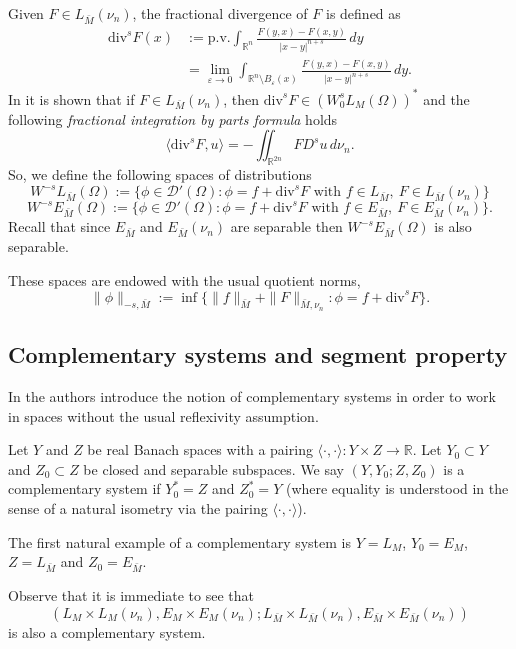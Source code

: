 \documentclass{amsart}
\newcommand{\R}{{\mathbb R}}
\newcommand{\ve}{\varepsilon}
\theoremstyle{remark}
\theoremstyle{definition}
\numberwithin{equation}{section}
\begin{document}
Given $F\in L_{\bar{M}}(\nu_n)$, the fractional divergence of $F$ is defined as
\begin{align*}
{\mathrm{div}}^s F(x) &:= \text{p.v.} \int_{\R^n} \frac{F(y,x)-F(x,y)}{|x-y|^{n+s}}\, dy \\
&= \lim_{\ve\to 0} \int_{\R^n\setminus B_\ve(x)}\frac{F(y,x)-F(x,y)}{|x-y|^{n+s}}\, dy.
\end{align*}
In \cite{FBPLS} it is shown that if $F\in L_{\bar M}(\nu_n)$, then ${\mathrm{div}}^s F\in (W^s_0L_M(\Omega))^*$ and the following {\em fractional integration by parts formula} holds
\begin{equation}\label{int.by.parts}
\langle {\mathrm{div}}^s F, u\rangle = -\iint_{\R^{2n}} F D^s u\, d\nu_n.
\end{equation}
So, we define the following spaces of distributions
$$
W^{-s}L_{\bar M}(\Omega) := \{\phi\in {\mathcal D}'(\Omega)\colon \phi = f + \mathrm{div}^sF \text{ with } f\in L_{\bar M},\ F\in L_{\bar M}(\nu_n)\}
$$
$$
W^{-s}E_{\bar M}(\Omega) := \{\phi\in {\mathcal D}'(\Omega)\colon \phi = f + \mathrm{div}^sF \text{ with } f\in E_{\bar M},\ F\in E_{\bar M}(\nu_n)\}.
$$
Recall that since $E_{\bar{M}}$ and $E_{\bar{M}}(\nu_n)$ are separable then $W^{-s}E_{\bar M}(\Omega)$ is also separable.

These spaces are endowed with the usual quotient norms,
$$
\|\phi\|_{-s, \bar M} := \inf\{\|f\|_{\bar M} + \|F\|_{\bar M, \nu_n}\colon \phi=f+\mathrm{div}^s F\}.
$$

\subsection{Complementary systems and segment property}\label{complementary}

In \cite{Do, DoTru} the authors introduce the notion of complementary systems in order to work in spaces without the usual reflexivity assumption.

Let $Y$ and $Z$ be real Banach spaces with a pairing $\langle\cdot,\cdot\rangle\colon Y\times Z\to \R$. Let $Y_0\subset Y$ and $Z_0\subset Z$ be closed and separable subspaces. We say $(Y, Y_0; Z, Z_0)$ is a complementary system if $Y_0^*=Z$ and $Z_0^*=Y$ (where equality is understood in the sense of a natural isometry via the pairing $\langle\cdot,\cdot\rangle$).

The first natural example of a complementary system is $Y=L_M$, $Y_0=E_M$, $Z=L_{\bar M}$ and $Z_0=E_{\bar M}$.

Observe that it is immediate to see that
\begin{equation}\label{LMEM}
\left (L_M\times L_M(\nu_n),E_M\times E_M(\nu_n); L_{\bar M}\times L_{\bar M}(\nu_n),E_{\bar M}\times E_{\bar M}(\nu_n)
\right)
\end{equation}
is also a complementary system.
\end{document}
